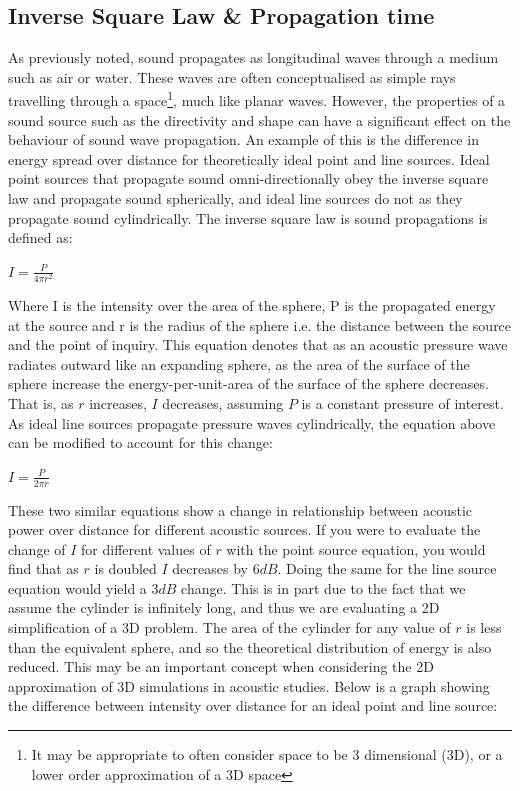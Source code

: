 \subsection{Inverse Square Law \& Propagation time}
As previously noted, sound propagates as longitudinal waves through a medium such as air or water. These waves are often conceptualised as simple rays~\cite{beranek1954acoustics} travelling through a space\footnote{It may be appropriate to often consider space to be 3 dimensional (3D), or a lower order approximation of a 3D space}, much like planar waves. However, the properties of a sound source such as the directivity and shape can have a significant effect on the behaviour of sound wave propagation. An example of this is the difference in energy spread over distance for theoretically ideal point and line sources. Ideal point sources that propagate sound omni-directionally obey the inverse square law and propagate sound spherically, and ideal line sources do not as they propagate sound cylindrically. The inverse square law is sound propagations is defined as:\\
\begin{center}
$I = \frac{P}{4 \pi r^2}$\\
\end{center}
Where I is the intensity over the area of the sphere, P is the propagated energy at the source and r is the radius of the sphere i.e. the distance between the source and the point of inquiry. This equation denotes that as an acoustic pressure wave radiates outward like an expanding sphere, as the area of the surface of the sphere increase the energy-per-unit-area of the surface of the sphere decreases. That is, as $r$ increases, $ I $ decreases, assuming $ P $ is a constant pressure of interest.\\
As ideal line sources propagate pressure waves cylindrically, the equation above can be modified to account for this change:\\
\begin{center}
$I = \frac{P}{2 \pi r}$\\
\end{center}
These two similar equations show a change in relationship between acoustic power over distance for different acoustic sources. If you were to evaluate the change of $I$ for different values of $r$ with the point source equation, you would find that as $r$ is doubled $I$ decreases by $6dB$. Doing the same for the line source equation would yield a $3dB$ change. This is in part due to the fact that we assume the cylinder is infinitely long, and thus we are evaluating a 2D simplification of a 3D problem. The area of the cylinder for any value of $r$ is less than the equivalent sphere, and so the theoretical distribution of energy is also reduced. This may be an important concept when considering the 2D approximation of 3D simulations in acoustic studies. Below is a graph showing the difference between intensity over distance for an ideal point and line source:\\


